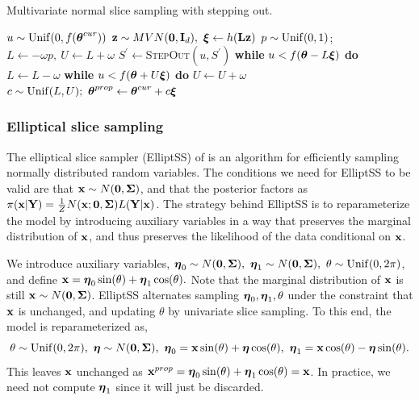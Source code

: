 \begin{algorithm}[htbp]
	\caption{Multivariate normal slice sampling with stepping out.}\label{alg:mvnss}
	\begin{algorithmic}[1]
		\State $ u \sim \mathrm{Unif}(0,f(\boldsymbol{\theta}^{cur})) $
		\State $\mathbf{z}\sim MVN(\mathbf{0},\mathbf{I}_d),\ \boldsymbol{\xi}\gets h(\mathbf{L}\mathbf{z})$ 
		\State $ p\sim \mathrm{Unif}(0,1) $; $ L \gets - \omega p,\ U \gets L+\omega $ 
		\State $ S^\prime \gets $\textsc{StepOut}$ (u,S^\prime) $ 
		\State\hspace{\algorithmicindent}\textbf{while }{$ u<f(\boldsymbol{\theta} - L\boldsymbol{\xi}) $} \textbf{do} $ L \gets L-\omega $
		\State\hspace{\algorithmicindent}\textbf{while }{$u<f(\boldsymbol{\theta} + U\boldsymbol{\xi})$} \textbf{do} $ U \gets U+\omega $
		\State $ c \sim \mathrm{Unif}(L,U);\  \boldsymbol{\theta}^{prop}\gets \boldsymbol{\theta}^{cur} + c\boldsymbol{\xi} $ 
		\State\Return{$ \new{\btheta} $}
		\Else{}
		\EndIf 	
		\EndIf
		\EndProcedure
	\end{algorithmic}
\end{algorithm}

\subsubsection{Elliptical slice sampling}
\label{subsubsec:elliptical_slice_sampling}

The elliptical slice sampler (ElliptSS) of \cite{murray2010} is an algorithm for efficiently sampling normally distributed random variables. 
The conditions we need for ElliptSS to be valid are that $ \mathbf{x}\sim N(\mathbf{0}, \boldsymbol{\Sigma}) $, and that the posterior factors as $ \pi(\mathbf{x}|\mathbf{Y})= \frac{1}{Z}N(\mathbf{x};\boldsymbol{0}, \boldsymbol{\Sigma})L(\mathbf{Y}|\mathbf{x}) $. The strategy behind ElliptSS is to reparameterize the model by introducing auxiliary variables in a way that preserves the marginal distribution of $ \mathbf{x} $, and thus preserves the likelihood of the data conditional on $ \mathbf{x} $.

We introduce auxiliary variables, $
\boldsymbol{\eta}_0 \sim N(\boldsymbol{0}, \boldsymbol{\Sigma}),\
\boldsymbol{\eta}_1 \sim N(\boldsymbol{0}, \boldsymbol{\Sigma}),\
\theta \sim \mathrm{Unif}(0, 2\pi)$, and define $
\mathbf{x} = \boldsymbol{\eta}_0\sin(\theta) + \boldsymbol{\eta}_1\cos(\theta). $ Note that the marginal distribution of $ \mathbf{x} $ is still $ \mathbf{x}\sim N(\boldsymbol{0}, \boldsymbol{\Sigma}) $. ElliptSS alternates sampling $ \boldsymbol{\eta}_0,\boldsymbol{\eta}_1,\theta $ under the constraint that $ \mathbf{x} $ is unchanged, and updating $ \theta $ by univariate slice sampling. To this end, the model is reparameterized as, $$\theta \sim \mathrm{Unif}(0, 2\pi),\
\boldsymbol{\eta} \sim N(\boldsymbol{0}, \boldsymbol{\Sigma}),\
\boldsymbol{\eta}_0 = \mathbf{x} \sin(\theta) + \boldsymbol{\eta} \cos(\theta),\
\boldsymbol{\eta}_1 = \mathbf{x}\cos(\theta) - \boldsymbol{\eta}\sin(\theta).$$ This leaves $ \mathbf{x} $ unchanged as $ \mathbf{x}^{prop} = \boldsymbol{\eta}_0\sin(\theta) + \boldsymbol{\eta}_1\cos(\theta) = \mathbf{x}$. In practice, we need not compute $ \boldsymbol{\eta}_1 $ since it will just be discarded.

